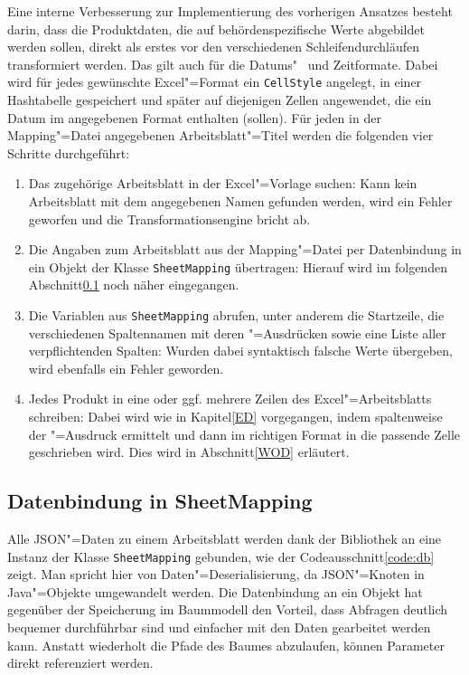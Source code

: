 Eine interne Verbesserung zur Implementierung des vorherigen Ansatzes besteht darin, dass die Produktdaten, die auf behördenspezifische Werte abgebildet werden sollen, direkt als erstes vor den verschiedenen Schleifendurchläufen transformiert werden. Das gilt auch für die Datums"~ und Zeitformate. Dabei wird für jedes gewünschte Excel"=Format ein \texttt{CellStyle} angelegt, in einer Hashtabelle gespeichert und später auf diejenigen Zellen angewendet, die ein Datum im angegebenen Format enthalten (sollen). 
Für jeden in der Mapping"=Datei angegebenen Arbeitsblatt"=Titel werden die folgenden vier Schritte durchgeführt: 
\begin{enumerate}
\item Das zugehörige Arbeitsblatt in der Excel"=Vorlage suchen: Kann kein Arbeitsblatt mit dem angegebenen Namen gefunden werden, wird ein Fehler geworfen und die Transformationsengine bricht ab.
\item Die Angaben zum Arbeitsblatt aus der Mapping"=Datei per Datenbindung in ein Objekt der Klasse \texttt{SheetMapping} übertragen: Hierauf wird im folgenden Abschnitt\nbs\ref{DB} noch näher eingegangen. 
\item Die Variablen aus \texttt{SheetMapping} abrufen, unter anderem die Startzeile, die verschiedenen Spaltennamen mit deren "=Ausdrücken sowie eine Liste aller verpflichtenden Spalten: Wurden dabei syntaktisch falsche Werte übergeben, wird ebenfalls ein Fehler geworden. 
\item Jedes Produkt in eine oder ggf. mehrere Zeilen des Excel"=Arbeitsblatts schreiben: Dabei wird wie in Kapitel\nbs\ref{ED} vorgegangen, indem spaltenweise der "=Ausdruck ermittelt und dann im richtigen Format in die passende Zelle geschrieben wird. Dies wird in Abschnitt\nbs\ref{WOD} erläutert.
\end{enumerate}

\subsection[Datenbindung]{Datenbindung in SheetMapping}\label{DB}
Alle JSON"=Daten zu einem Arbeitsblatt werden dank der Bibliothek  an eine Instanz der Klasse \texttt{SheetMapping} gebunden, wie der Codeausschnitt\nbs\ref{code:db} zeigt. Man spricht hier von Daten"=Deserialisierung, da JSON"=Knoten in Java"=Objekte umgewandelt werden. 
Die Datenbindung an ein Objekt hat gegenüber der Speicherung im Baummodell den Vorteil, dass Abfragen deutlich bequemer durchführbar sind und einfacher mit den Daten gearbeitet werden kann. Anstatt wiederholt die Pfade des Baumes abzulaufen, können Parameter direkt referenziert werden.

